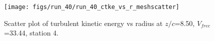 \begin{figure}[H]
\centering
\texttt{[image: figs/run\_40/run\_40\_ctke\_vs\_r\_meshscatter]}
\caption{Scatter plot of turbulent kinetic energy vs radius at $z/c$=8.50, $V_{free}$=33.44, station 4.}
\label{fig:run_40_ctke_vs_r_meshscatter}
\end{figure}


